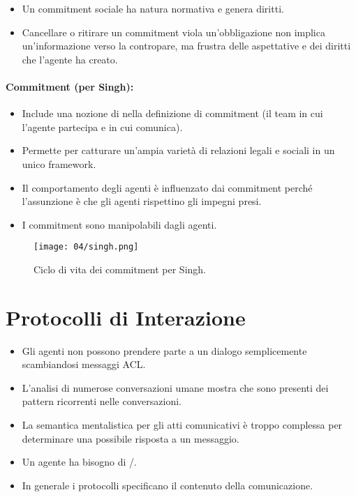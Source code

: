 \begin{itemize}
  \item Un commitment sociale ha natura normativa e genera diritti. 
  \item Cancellare o ritirare un commitment viola un'obbligazione non implica un'informazione verso la contropare, ma frustra delle aspettative e dei diritti che l'agente ha creato.
\end{itemize}

\paragraph{Commitment (per Singh):}

\begin{itemize}
  \item Include una nozione di  nella definizione di commitment (il team in cui l'agente partecipa e in cui comunica). 
  \item Permette  per catturare un'ampia varietà di relazioni legali e sociali in un unico framework. 
  \item Il comportamento degli agenti è influenzato dai commitment perché l'assunzione è che gli agenti rispettino gli impegni presi. 
  \item I commitment sono manipolabili dagli agenti.
\end{itemize}

\begin{figure}[!h]
    \centering
    \texttt{[image: 04/singh.png]}
  \caption{Ciclo di vita dei commitment per Singh.}
\end{figure}

\section{Protocolli di Interazione}

\begin{itemize}
  \item Gli agenti non possono prendere parte a un dialogo semplicemente scambiandosi messaggi ACL. 
  \item L'analisi di numerose conversazioni umane mostra che sono presenti dei pattern ricorrenti nelle conversazioni. 
  \item La semantica mentalistica per gli atti comunicativi è troppo complessa per determinare una possibile risposta a un messaggio. 
  \item Un agente ha bisogno di /. 
  \item In generale i protocolli specificano il contenuto della comunicazione.
\end{itemize}

